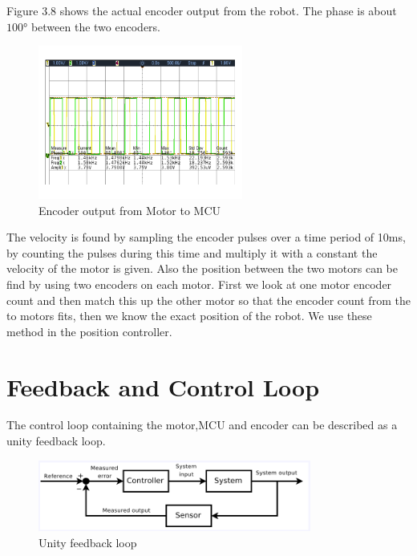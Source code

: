 Figure 3.8 shows the actual encoder output from the robot. The phase is about $\ang{100}$ between the two encoders.
  \begin{figure}[!h!]
	\centering
	\includegraphics[width=0.6\textwidth]{resources/Scop/encoder.png}
	\caption{Encoder output from Motor to MCU}
	\label{fig:6}
\end{figure}
The velocity is found by sampling the encoder pulses over a time period of 10ms, by counting the pulses during this time and multiply it with a constant the velocity of the motor is given.
Also the position between the two motors can be find by using two encoders on each motor. First we look at one motor encoder count and then match this up the other motor so that the encoder count from the to motors fits, then we know the exact position of the robot. We use these method in the position controller.    

\section{Feedback and Control Loop}
The control loop containing the motor,MCU and encoder can be described as a unity feedback loop.


  \begin{figure}[!h!]
	\centering
	\includegraphics[width=0.8\textwidth]{resources/feedbackloop.png}
	\caption{Unity feedback loop}
	\label{fig:6}
\end{figure}

